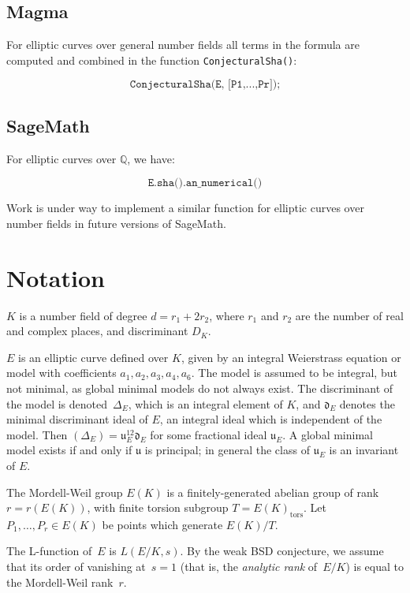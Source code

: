 \documentclass{amsart}
\newcommand{\software}[1]{\textsf{#1}} %
\newcommand{\Sage}{\software{SageMath}}
\newcommand{\Magma}{\software{Magma}{}}
\newcommand\Q{\mathbb{Q}}
\DeclareMathOperator{\tors}{tors}
\begin{document}
\subsection{\Magma}\label{magma}

For elliptic curves over general number fields all terms in the formula
are computed and combined in the function \texttt{ConjecturalSha()}:

\[
\texttt{ConjecturalSha(E,\ {[}P1,...,Pr{]});}
\]

\subsection{\Sage}\label{sage}

For elliptic curves over \(\Q\), we have:

\[
\texttt{E.sha().an\_numerical()}
\]

Work is under way to implement a similar function for elliptic curves
over number fields in future versions of \Sage.

\section{Notation}\label{notation}

\(K\) is a number field of degree \(d=r_1+2r_2\), where \(r_1\) and
\(r_2\) are the number of real and complex places, and discriminant
\(D_K\).

\(E\) is an elliptic curve defined over \(K\), given by an integral
Weierstrass equation or model with coefficients
\(a_1,a_2,a_3,a_4,a_6\).  The model is assumed to be integral, but not
minimal, as global minimal models do not always exist.  The
discriminant of the model is denoted~\(\Delta_E\), which is an
integral element of \(K\), and \(\mathfrak{d}_E\) denotes the minimal
discriminant ideal of \(E\), an integral ideal which is independent of
the model. Then \((\Delta_E) = \mathfrak{u}_E^{12}\mathfrak{d}_E\) for
some fractional ideal \(\mathfrak{u}_E\). A global minimal model
exists if and only if \(\mathfrak{u}\) is principal; in general the
class of \(\mathfrak{u}_E\) is an invariant of \(E\).

The Mordell-Weil group \(E(K)\) is a finitely-generated abelian group of
rank \(r=r(E(K))\), with finite torsion subgroup \(T=E(K)_{\tors}\). Let
\(P_1,\dots,P_r\in E(K)\) be points which generate \(E(K)/T\).

The L-function of~$E$ is $L(E/K, s)$.  By the weak BSD conjecture, we
assume that its order of vanishing at~$s=1$ (that is, the {\em
  analytic rank} of~$E/K$) is equal to the Mordell-Weil rank~$r$.
\end{document}
